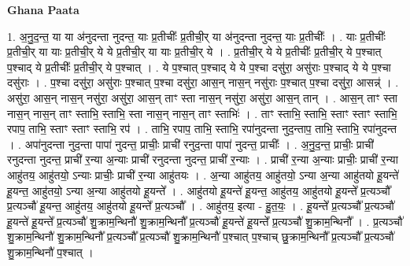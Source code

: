 \documentclass[17pt]{extarticle}
\begin{document}
\textbf{Ghana Paata } \newline

1. अ॒नु॒द॒न्त॒ या या अ॑नुदन्ता नुदन्त॒ याः प्र॒तीचीः᳚ प्र॒तीची॒र् या अ॑नुदन्ता नुदन्त॒ याः प्र॒तीचीः᳚ । . याः प्र॒तीचीः᳚ प्र॒तीची॒र् या याः प्र॒तीची॒र् ये ये प्र॒तीची॒र् या याः प्र॒तीची॒र् ये । . प्र॒तीची॒र् ये ये प्र॒तीचीः᳚ प्र॒तीची॒र् ये प॒श्चात् प॒श्चाद् ये प्र॒तीचीः᳚ प्र॒तीची॒र् ये प॒श्चात् । . ये प॒श्चात् प॒श्चाद् ये ये प॒श्चा दसु॑रा॒ असु॑राः प॒श्चाद् ये ये प॒श्चा दसु॑राः । . प॒श्चा दसु॑रा॒ असु॑राः प॒श्चात् प॒श्चा दसु॑रा॒ आस॒न् नास॒न् नसु॑राः प॒श्चात् प॒श्चा दसु॑रा॒ आसन्न्॑ । . असु॑रा॒ आस॒न् नास॒न् नसु॑रा॒ असु॑रा॒ आस॒न् ताꣳ स्ता नास॒न् नसु॑रा॒ असु॑रा॒ आस॒न् तान् । . आस॒न् ताꣳ स्ता नास॒न् नास॒न् ताꣳ स्ताभि॒ स्ताभि॒ स्ता नास॒न् नास॒न् ताꣳ स्ताभिः॑ । . ताꣳ स्ताभि॒ स्ताभि॒ स्ताꣳ स्ताꣳ स्ताभि॒ रपाप॒ ताभि॒ स्ताꣳ स्ताꣳ स्ताभि॒ रप॑ । . ताभि॒ रपाप॒ ताभि॒ स्ताभि॒ रपा॑नुदन्ता नुद॒न्ताप॒ ताभि॒ स्ताभि॒ रपा॑नुदन्त । . अपा॑नुदन्ता नुद॒न्ता पापा॑ नुदन्त॒ प्राचीः॒ प्राची॑ रनुद॒न्ता पापा॑ नुदन्त॒ प्राचीः᳚ । . अ॒नु॒द॒न्त॒ प्राचीः॒ प्राची॑ रनुदन्ता नुदन्त॒ प्राची॑ र॒न्या अ॒न्याः प्राची॑ रनुदन्ता नुदन्त॒ प्राची॑ र॒न्याः । . प्राची॑ र॒न्या अ॒न्याः प्राचीः॒ प्राची॑ र॒न्या आहु॑तय॒ आहु॑तयो॒ ऽन्याः प्राचीः॒ प्राची॑ र॒न्या आहु॑तयः । . अ॒न्या आहु॑तय॒ आहु॑तयो॒ ऽन्या अ॒न्या आहु॑तयो हू॒यन्ते॑ हू॒यन्त॒ आहु॑तयो॒ ऽन्या अ॒न्या आहु॑तयो हू॒यन्ते᳚ । . आहु॑तयो हू॒यन्ते॑ हू॒यन्त॒ आहु॑तय॒ आहु॑तयो हू॒यन्ते᳚ प्र॒त्यञ्चौ᳚ प्र॒त्यञ्चौ॑ हू॒यन्त॒ आहु॑तय॒ आहु॑तयो हू॒यन्ते᳚ प्र॒त्यञ्चौ᳚ । . आहु॑तय॒ इत्या - हु॒त॒यः॒ । . हू॒यन्ते᳚ प्र॒त्यञ्चौ᳚ प्र॒त्यञ्चौ॑ हू॒यन्ते॑ हू॒यन्ते᳚ प्र॒त्यञ्चौ॑ शु॒क्राम॒न्थिनौ॑ शु॒क्राम॒न्थिनौ᳚ प्र॒त्यञ्चौ॑ हू॒यन्ते॑ हू॒यन्ते᳚ प्र॒त्यञ्चौ॑ शु॒क्राम॒न्थिनौ᳚ । . प्र॒त्यञ्चौ॑ शु॒क्राम॒न्थिनौ॑ शु॒क्राम॒न्थिनौ᳚ प्र॒त्यञ्चौ᳚ प्र॒त्यञ्चौ॑ शु॒क्राम॒न्थिनौ॑ प॒श्चात् प॒श्चाच् छु॒क्राम॒न्थिनौ᳚ प्र॒त्यञ्चौ᳚ प्र॒त्यञ्चौ॑ शु॒क्राम॒न्थिनौ॑ प॒श्चात् । \newline
\end{document}
